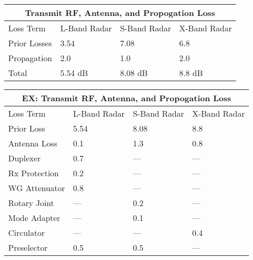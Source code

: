 \documentclass[12pt]{article}
\begin{document}
\begin{center}
    \begin{tabular}{ |p{4cm}|p{3cm}|p{3cm}|p{3cm}|}
        \hline
            \multicolumn{4}{|c|}{Transmit RF, Antenna, and Propogation Loss} \\
        \hline
            Loss Term & L-Band Radar & S-Band Radar & X-Band Radar \\
        \hline
            Prior Losses & 3.54 & 7.08 & 6.8 \\
            Propagation & 2.0 & 1.0 & 2.0 \\
            Total & 5.54 dB & 8.08 dB & 8.8 dB \\
        \hline
    \end{tabular}
\end{center}

\begin{center}
    \begin{tabular}{ |p{4cm}|p{3cm}|p{3cm}|p{3cm}|}
        \hline
            \multicolumn{4}{|c|}{EX: Transmit RF, Antenna, and Propogation Loss} \\
        \hline
            Loss Term & L-Band Radar & S-Band Radar & X-Band Radar \\
        \hline
            Prior Loss & 5.54 & 8.08 & 8.8\\
            Antenna Loss & 0.1 & 1.3 & 0.8 \\
            Duplexer & 0.7 & --- & --- \\
            Rx Protection & 0.2 & --- & --- \\
            WG Attenuator& 0.8 & --- & --- \\
            Rotary Joint & --- & 0.2 & --- \\
            Mode Adapter & --- & 0.1 & --- \\
            Circulator & --- & --- & 0.4 \\
            Preselector & 0.5 & 0.5 & --- \\
        \hline
    \end{tabular}
\end{center}
\end{document}
